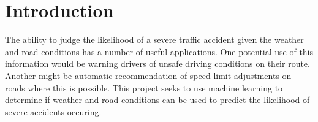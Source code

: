 \section*{Introduction}
The ability to judge the likelihood of a severe traffic accident given the weather and road conditions has a number of useful applications. One potential use of this information would be warning drivers of unsafe driving conditions on their route. Another might be automatic recommendation of speed limit adjustments on roads where this is possible. This project seeks to use machine learning to determine if weather and road conditions can be used to predict the likelihood of severe accidents occuring.
